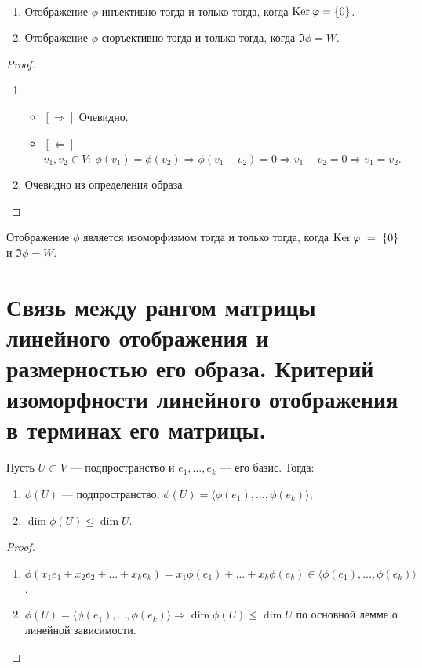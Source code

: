 \begin{Suggestion}\
    \begin{enumerate}
        \item Отображение $\phi$ инъективно тогда и только тогда, когда $\mathrm{Ker}\: \varphi = \{0\}$.
        \item Отображение $\phi$ сюръективно тогда и только тогда, когда $\Im \phi = W$.
    \end{enumerate} 
\end{Suggestion}

\begin{proof}\
    \begin{enumerate}
        \item \begin{itemize}
            \item $[\Rightarrow]$ Очевидно.
            \item $[\Leftarrow]$ $v_1, v_2 \in V :\ \phi(v_1)=\phi(v_2) \Rightarrow \phi (v_1 - v_2) = 0 \Rightarrow v_1 - v_2 = 0 \Rightarrow v_1 = v_2 $.
        \end{itemize}
        \item Очевидно из определения образа.
    \end{enumerate}
\end{proof}

\begin{Consequence}
    Отображение $\phi$ является изоморфизмом тогда и только тогда, когда $\mathrm{Ker}\: \varphi~=~\{0\}$ и $\Im \phi = W$.
\end{Consequence}

\section{Связь между рангом матрицы линейного отображения и размерностью его образа. Критерий изоморфности линейного отображения в терминах его матрицы.}

\begin{Suggestion}
    Пусть $U \subset V$ --- подпространство и $e_1, \ldots, e_k$ --- его базис. Тогда:
    \begin{enumerate}
        \item $\phi(U)$ --- подпространство, $\phi(U) = \langle \phi(e_1), \ldots, \phi(e_k)\rangle$;
        \item $\dim \phi(U) \leqslant \dim U$.
    \end{enumerate}
\end{Suggestion}

\begin{proof}\
    \begin{enumerate}
        \item $\phi(x_1e_1 + x_2e_2 + \ldots + x_ke_k) = x_1\phi(e_1) + \ldots + x_k\phi(e_k) \in \langle \phi(e_1), \ldots, \phi(e_k)\rangle$.
        \item $\phi(U) = \langle\phi(e_1), \ldots, \phi(e_k)\rangle \Rightarrow \dim \phi(U) \leqslant \dim U$ по основной лемме о линейной зависимости.
    \end{enumerate}
\end{proof}

